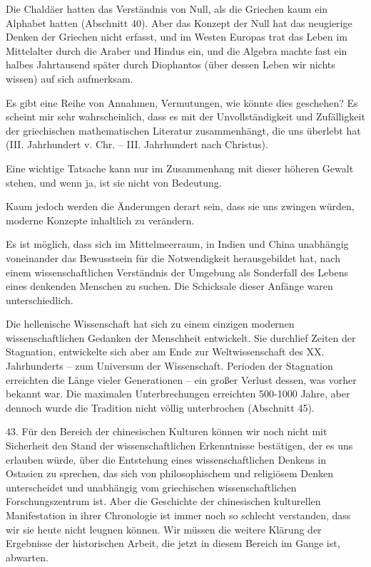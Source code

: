 \documentclass[11pt,a4paper]{book}
\begin{document}
Die Chaldäer hatten das Verständnis von Null, als die Griechen kaum ein Alphabet hatten (Abschnitt 40). Aber das Konzept der Null hat das neugierige Denken der Griechen nicht erfasst, und im Westen Europas trat das Leben im Mittelalter durch die Araber und Hindus ein, und die Algebra machte fast ein halbes Jahrtausend später durch Diophantos (über dessen Leben wir nichts wissen) auf sich aufmerksam. 

Es gibt eine Reihe von Annahmen, Vermutungen, wie könnte dies geschehen? Es scheint mir sehr wahrscheinlich, dass es mit der Unvollständigkeit und Zufälligkeit der griechischen mathematischen Literatur zusammenhängt, die uns überlebt hat (III. Jahrhundert v. Chr. -- III. Jahrhundert nach Christus). 

Eine wichtige Tatsache kann nur im Zusammenhang mit dieser höheren Gewalt stehen, und wenn ja, ist sie nicht von Bedeutung. 

Kaum jedoch werden die Änderungen derart sein, dass sie uns zwingen würden, moderne Konzepte inhaltlich zu verändern. 

Es ist möglich, dass sich im Mittelmeerraum, in Indien und China unabhängig voneinander das Bewusstsein für die Notwendigkeit herausgebildet hat, nach einem wissenschaftlichen Verständnis der Umgebung als Sonderfall des Lebens eines denkenden Menschen zu suchen. Die Schicksale dieser Anfänge waren unterschiedlich. 

Die hellenische Wissenschaft hat sich zu einem einzigen modernen wissenschaftlichen Gedanken der Menschheit entwickelt. Sie durchlief Zeiten der Stagnation, entwickelte sich aber am Ende zur Weltwissenschaft des XX. Jahrhunderts -- zum Universum der Wissenschaft. Perioden der Stagnation erreichten die Länge vieler Generationen -- ein großer Verlust dessen, was vorher bekannt war. Die maximalen Unterbrechungen erreichten 500-1000 Jahre, aber dennoch wurde die Tradition nicht völlig unterbrochen (Abschnitt 45). 

43. Für den Bereich der chinesischen Kulturen können wir noch nicht mit Sicherheit den Stand der wissenschaftlichen Erkenntnisse bestätigen, der es uns erlauben würde, über die Entstehung eines wissenschaftlichen Denkens in Ostasien zu sprechen, das sich von philosophischem und religiösem Denken unterscheidet und unabhängig vom griechischen wissenschaftlichen Forschungszentrum ist. Aber die Geschichte der chinesischen kulturellen Manifestation in ihrer Chronologie ist immer noch so schlecht verstanden, dass wir sie heute nicht leugnen können. Wir müssen die weitere Klärung der Ergebnisse der historischen Arbeit, die jetzt in diesem Bereich im Gange ist, abwarten. 
\end{document}
